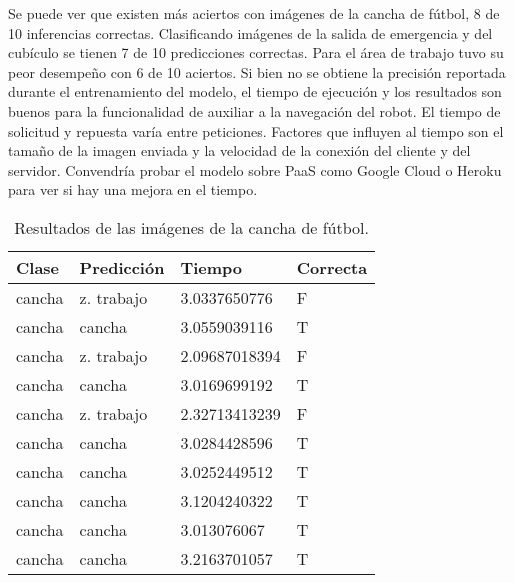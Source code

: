 Se puede ver que existen más aciertos
con imágenes de la cancha de fútbol, 8 de 10 inferencias correctas.
Clasificando imágenes de la salida de emergencia
y del cubículo se tienen 7 de 10 predicciones correctas.
Para el área de trabajo tuvo su peor desempeño con 6 de
10 aciertos. Si bien no se obtiene
la precisión reportada durante el
entrenamiento del modelo, el tiempo
de ejecución y los
resultados son buenos
para la funcionalidad de
auxiliar a la navegación del robot.
El tiempo de solicitud y repuesta varía entre peticiones.
Factores que influyen al tiempo son el tamaño de la 
imagen enviada y la velocidad de la conexión del cliente
y del servidor. Convendría probar el modelo sobre PaaS
como Google Cloud o Heroku para ver si hay una mejora
en el tiempo.



\begin{table}[H]
\centering
\begin{tabular}{|l|l|l|l|}
\hline
Clase        & Predicción   & Tiempo        & Correcta \\ \hline
cancha & z. trabajo        & 3.0337650776 & F        \\ \hline
cancha & cancha & 3.0559039116 & T        \\ \hline
cancha & z. trabajo        & 2.09687018394 & F        \\ \hline
cancha & cancha & 3.0169699192 & T        \\ \hline
cancha & z. trabajo        & 2.32713413239 & F        \\ \hline
cancha & cancha & 3.0284428596 & T        \\ \hline
cancha & cancha & 3.0252449512 & T        \\ \hline
cancha & cancha & 3.1204240322 & T        \\ \hline
cancha & cancha & 3.013076067  & T        \\ \hline
cancha & cancha & 3.2163701057 & T        \\ \hline
\end{tabular}
\caption{Resultados de las imágenes de la cancha de fútbol.}
\label{table:soccer_nao_results}
\end{table}

